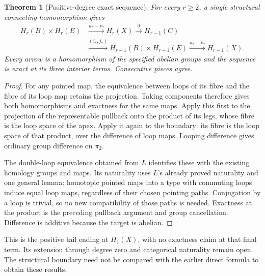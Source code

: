\documentclass[11pt]{amsart}
\numberwithin{equation}{section}
\newtheorem{theorem}{Theorem}[section]
\theoremstyle{definition}
\theoremstyle{remark}
\begin{document}
\begin{theorem}[Positive-degree exact sequence]
For every $r\geq2$, a single structural connecting homomorphism gives
\[
\begin{aligned}
 H_r(B)\times H_r(E)&\xrightarrow{u_*-v_*}H_r(X)
 \xrightarrow{\partial}H_{r-1}(C)\\
 &\xrightarrow{(i_*,j_*)}H_{r-1}(B)\times H_{r-1}(E)
 \xrightarrow{u_*-v_*}H_{r-1}(X).
\end{aligned}
\]
Every arrow is a homomorphism of the specified abelian groups and the
sequence is exact at its three interior terms. Consecutive pieces agree.
\end{theorem}
\begin{proof}
For any pointed map, the equivalence between loops of its fibre and
the fibre of its loop map retains the projection. Taking components
therefore gives both homomorphisms and exactness for the same maps.
Apply this first to the projection of the representable pullback onto
the product of its legs, whose fibre is the loop space of the apex.
Apply it again to the boundary: its fibre is the loop space of that
product, over the difference of loop maps. Looping difference gives
ordinary group difference on $\pi_2$.

The double-loop equivalence obtained from $L$ identifies these with
the existing homology groups and maps. Its naturality uses $L$'s
already proved naturality and one general lemma: homotopic pointed
maps into a type with commuting loops induce equal loop maps,
regardless of their chosen pointing paths. Conjugation by a loop
is trivial, so no new compatibility of those paths is needed.
Exactness at the product is the preceding pullback argument and group
cancellation. Difference is additive because the target is abelian.
\end{proof}
This is the positive tail ending at $H_1(X)$, with no exactness claim
at that final term. Its extension through degree zero and categorical
naturality remain open. The structural boundary need not be compared
with the earlier direct formula to obtain these results.
\end{document}
